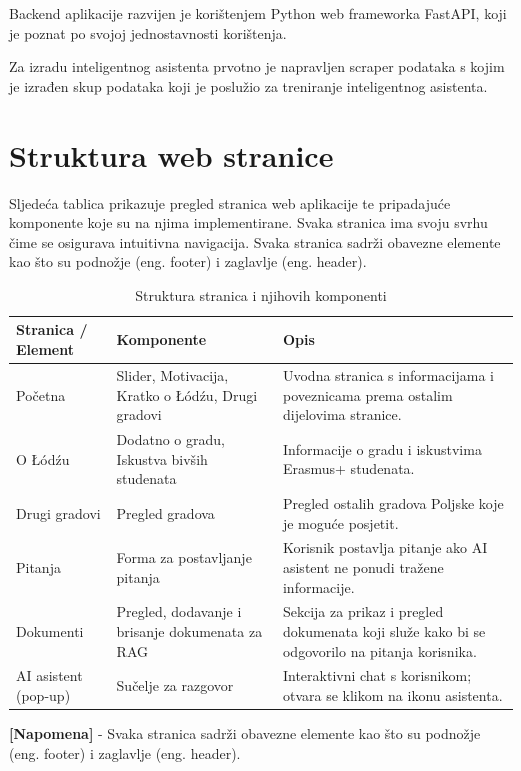 \documentclass[]{foi}
\renewcommand{\arraystretch}{1.3}
\begin{document}
Backend aplikacije razvijen je korištenjem Python web frameworka FastAPI, koji je poznat po svojoj jednostavnosti korištenja.


Za izradu inteligentnog asistenta prvotno je napravljen scraper podataka s kojim je
izrađen skup podataka koji je poslužio za treniranje inteligentnog asistenta.



\section{Struktura web stranice}
Sljedeća tablica prikazuje pregled stranica web aplikacije te pripadajuće komponente koje su na njima implementirane. Svaka stranica ima svoju
svrhu čime se osigurava intuitivna navigacija. Svaka stranica sadrži obavezne elemente kao što su podnožje (eng. footer) i zaglavlje (eng. header).
\begin{table}[h!]
\centering
\caption{Struktura stranica i njihovih komponenti}
\renewcommand{\arraystretch}{1.4}
\begin{tabular}{|p{3.5cm}|p{5cm}|p{6.2cm}|}
\hline
\textbf{Stranica / Element} & \textbf{Komponente} & \textbf{Opis} \\
\hline
Početna & Slider, Motivacija, Kratko o Łódźu, Drugi gradovi & Uvodna stranica s informacijama i poveznicama prema ostalim dijelovima stranice. \\
\hline
O Łódźu & Dodatno o gradu, Iskustva bivših studenata & Informacije o gradu i iskustvima Erasmus+ studenata. \\
\hline
Drugi gradovi & Pregled gradova & Pregled ostalih gradova Poljske koje je moguće posjetit. \\
\hline
Pitanja & Forma za postavljanje pitanja & Korisnik postavlja pitanje ako AI asistent ne ponudi tražene informacije. \\
\hline
Dokumenti & Pregled, dodavanje i brisanje dokumenata za RAG & Sekcija za prikaz i pregled dokumenata koji služe kako bi se odgovorilo na pitanja korisnika. \\
\hline
AI asistent (pop-up) & Sučelje za razgovor & Interaktivni chat s korisnikom; otvara se klikom na ikonu asistenta. \\
\hline
\end{tabular}
\end{table}

\textbf{[Napomena]} - Svaka stranica sadrži obavezne elemente kao što su podnožje (eng. footer) i zaglavlje (eng. header).
\end{document}
